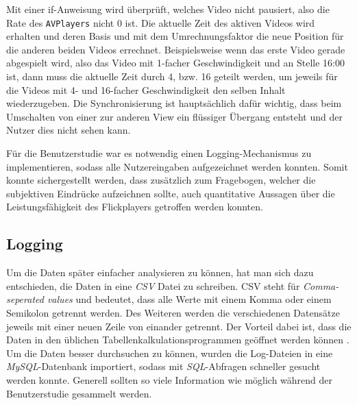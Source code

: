 \documentclass[11pt,a4paper]{report}
\begin{document}
Mit einer if-Anweisung wird überprüft, welches Video nicht pausiert, also die Rate des \texttt{AVPlayers} nicht 0 ist. Die aktuelle Zeit des aktiven Videos wird erhalten und deren Basis und mit dem Umrechnungsfaktor die neue Position für die anderen beiden Videos errechnet. Beispielsweise wenn das erste Video gerade abgespielt wird, also das Video mit 1-facher Geschwindigkeit und an Stelle 16:00 ist, dann muss die aktuelle Zeit durch 4, bzw. 16 geteilt werden, um jeweils für die Videos mit 4- und 16-facher Geschwindigkeit den selben Inhalt wiederzugeben. Die Synchronisierung ist hauptsächlich dafür wichtig, dass beim Umschalten von einer zur anderen View ein flüssiger Übergang entsteht und der Nutzer dies nicht sehen kann.

Für die Benutzerstudie war es notwendig einen Logging-Mechanismus zu implementieren, sodass alle Nutzereingaben aufgezeichnet werden konnten. Somit konnte sichergestellt werden, dass zusätzlich zum Fragebogen, welcher die subjektiven Eindrücke aufzeichnen sollte, auch quantitative Aussagen über die Leistungsfähigkeit des Flickplayers getroffen werden konnten.

\subsection{Logging}

Um die Daten später einfacher analysieren zu können, hat man sich dazu entschieden, die Daten in eine \textit{CSV} Datei zu schreiben. CSV steht für \textit{Comma-seperated values} und bedeutet, dass alle Werte mit einem Komma oder einem Semikolon getrennt werden. Des Weiteren werden die verschiedenen Datensätze jeweils mit einer neuen Zeile von einander getrennt. Der Vorteil dabei ist, dass die Daten in den üblichen Tabellenkalkulationsprogrammen geöffnet werden können \cite{louis2007java}. Um die Daten besser durchsuchen zu können, wurden die Log-Dateien in eine \textit{MySQL}-Datenbank importiert, sodass mit \textit{SQL}-Abfragen schneller gesucht werden konnte. Generell sollten so viele Information wie möglich während der Benutzerstudie gesammelt werden.
\end{document}

